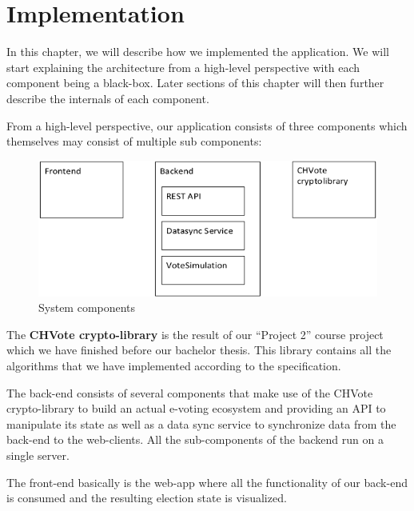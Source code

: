 \chapter{Implementation}
In this chapter, we will describe how we implemented the application. We will start explaining the architecture from a high-level perspective with each component being a black-box. Later sections of this chapter will then further describe the internals of each component.

From a high-level perspective, our application consists of three components which themselves may consist of multiple sub components:
\begin{figure}[h!]
\begin{center}
\includegraphics[scale=0.95]{assets/componentdiagram.png}
\caption{System components}
\end{center}
\end{figure}
The \textbf{CHVote crypto-library} is the result of our "`Project 2"' course project which we have finished before our bachelor thesis. This library contains all the algorithms that we have implemented according to the specification. 

The back-end consists of several components that make use of the CHVote crypto-library to build an actual e-voting ecosystem and providing an API to manipulate its state as well as a data sync service to synchronize data from the back-end to the web-clients. All the sub-components of the backend run on a single server.

The front-end basically is the web-app where all the functionality of our back-end is consumed and the resulting election state is visualized.
